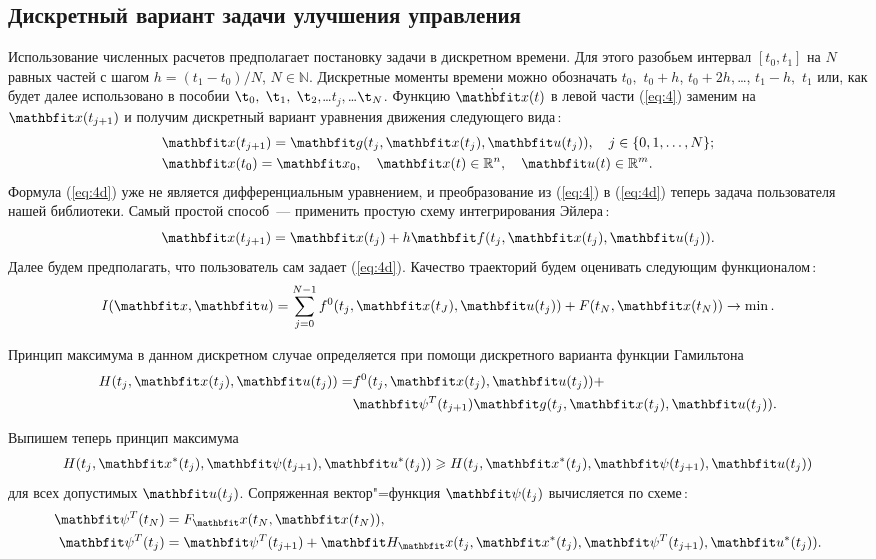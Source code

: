 \documentclass[a4paper,14pt, openany, twoside, draft]{extbook} %
\begin{document}
\subsection{Дискретный вариант задачи улучшения управления}
\label{sec:discrete}

Использование численных расчетов предполагает постановку задачи в дискретном времени.  Для этого разобьем интервал $[t_0,t_1]$ на $N$ равных частей с шагом $h=(t_1-t_0)/N$, $N\in\mathbb{N}$.  Дискретные моменты времени можно обозначать $t_0,$ $t_0+h$, $t_0+2h,$\ldots, $t_1-h,$ $t_1$ или, как будет далее использовано в пособии $\t_0,$ $\t_1,$ $\t_2,$\ldots $t_j,$\ldots $\t_N$.  Функцию $\dot{\vecx}(t)$ в левой части (\ref{eq:4}) заменим на $\vecx(t_{j+1})$ и получим дискретный вариант уравнения движения следующего вида\,:
\begin{align}
  \label{eq:4d}
  &\vecx(t_{j+1})=\vecg(t_j,\vecx(t_j),\vecu(t_j)),\quad j\in\{0,1,\ldots,N\};\\
  \label{eq:4dcond}
  &\vecx(t_0)=\vecx_0, \quad \vecx(t)\in\mathbb{R}^n,  \quad \vecu(t)\in\mathbb{R}^m.
\end{align}
Формула (\ref{eq:4d}) уже не является дифференциальным уравнением, и преобразование из (\ref{eq:4}) в (\ref{eq:4d}) теперь задача пользователя нашей библиотеки.  Самый простой способ~--- применить простую схему интегрирования Эйлера\,:
\begin{equation}
  \label{eq:4d1} \nonumber
  \vecx(t_{j+1})=\vecx(t_j)+h\vecf(t_j,\vecx(t_j),\vecu(t_j)).
\end{equation}
Далее будем предполагать, что пользователь сам задает (\ref{eq:4d}).  Качество траекторий будем оценивать следующим функционалом\,:
\begin{equation}
  I(\vecx,\vecu)=\sum_{j=0}^{N-1}f^0(t_j,\vecx(t_J),\vecu(t_j))+F(t_N,\vecx(t_N)) \to \min.
    \label{eq103}
\end{equation}

Принцип максимума в данном дискретном случае определяется при помощи дискретного варианта функции Гамильтона
\begin{align}
  H(t_j,\vecx(t_j),\vecu(t_j))=&f^0(t_j,\vecx(t_j),\vecu(t_j))+\nonumber\\
   &\vecpsi^T(t_{j+1})\vecg(t_j,\vecx(t_j),\vecu(t_j)).   \label{eq:descH}
\end{align}

Выпишем теперь принцип максимума
\begin{align}
  H(t_j,\vecx^*(t_j),\vecpsi(t_{j+1}),\vecu^*(t_j))\geqslant H(t_j,\vecx^*(t_j),\vecpsi(t_{j+1}),\vecu(t_j)) \label{eq:descMax}
\end{align}
для всех допустимых $\vecu(t_j)$.  Сопряженная вектор"=функция $\vecpsi(t_j)$ вычисляется по схеме\,:
\begin{align}
  \label{eq:startPsi}
  \vecpsi^T(t_N)&=F_\vecx(t_N,\vecx(t_N)), \nonumber\\ \vecpsi^T(t_j)&=\vecpsi^T(t_{j+1})+\vecH_\vecx(t_j,\vecx^*(t_j),\vecpsi^T(t_{j+1}),\vecu^*(t_j)).
\end{align}
\end{document}
